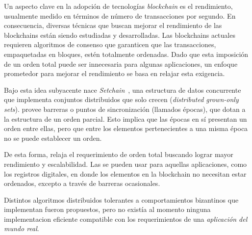   Un aspecto clave en la adopción de tecnologías \textit{blockchain} es el rendimiento,
  usualmente medido en términos de número de transacciones por segundo.
  En consecuencia, diversas técnicas que buscan mejorar el rendimiento de las blockchains
  están siendo estudiadas y desarrolladas.
  Las blockchains actuales requieren algoritmos de consenso que garanticen que las
  transacciones, empaquetadas en bloques, estén totalmente ordenadas.
  Dado que esta imposición de un orden total puede ser innecesaria para algunas aplicaciones,
  un enfoque prometedor para mejorar el rendimiento se basa en relajar esta exigencia.

  Bajo esta idea subyacente nace \textit{Setchain}~\cite{Capretto.2022.Setchain}, una estructura de
  datos concurrente que implementa conjuntos distribuidos que solo crecen
  (\textit{distributed grown-only sets}).
  \setchain provee barreras o puntos de sincronización
  (llamados épocas), que dotan a la estructura de un orden parcial.
  Esto implica que las épocas en sí presentan un orden entre ellas,
  pero que entre los elementos pertenecientes a una misma época no
  se puede establecer un orden.

  De esta forma, relaja el requerimiento de orden total buscando lograr mayor
  rendimiento y escalabilidad.
  Las \setchains se pueden usar para aquellas aplicaciones, como los registros digitales,
  en donde los elementos en la blockchain no necesitan estar ordenados, excepto a través
  de barreras ocasionales.
  
  
  Distintos algoritmos distribuidos tolerantes a comportamientos bizantinos que
  implementan \setchain fueron propuestos, pero no existía al momento ninguna
  implementacion eficiente compatible con
  los requerimientos de una \textit{aplicación del mundo real}.
  
